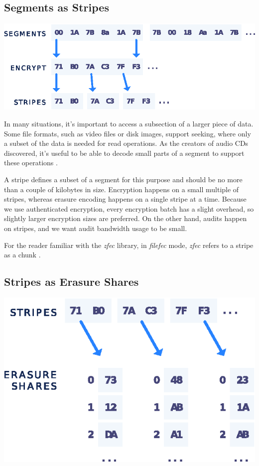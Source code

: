 \documentclass[8pt,fleqn,openany]{book}
\begin{document}
\subsection{Segments as Stripes}\label{segments-as-stripes}

\begin{center}
\includegraphics[width=.65\textwidth]{images/segment-stripe.eps}
\end{center}

In many situations, it's important to access a subsection of a larger piece of
data. Some file formats, such as video files or disk images, support seeking,
where only a subset of the data is needed for read operations.
As the creators of audio CDs discovered,
it's useful to be able to decode small parts of a segment
to support these operations \cite{rs-cd}.

A stripe defines a subset of a segment for this purpose and should be no more than a
couple of kilobytes in size. Encryption happens on a small multiple of stripes,
whereas erasure encoding happens on a single stripe at a time. Because we
use authenticated encryption, every encryption batch has a slight overhead,
so slightly larger encryption sizes are preferred. On the other hand, audits
happen on stripes, and we want audit bandwidth usage to be small.

For the reader familiar with the {\em zfec} library, in {\em filefec} mode,
{\em zfec} refers to a stripe as a chunk \cite{filefec-packing}.

\subsection{Stripes as Erasure Shares}\label{stripes-as-erasure-shares}

\begin{center}
\includegraphics[width=.45\textwidth]{images/stripe-share.eps}
\end{center}
\end{document}
